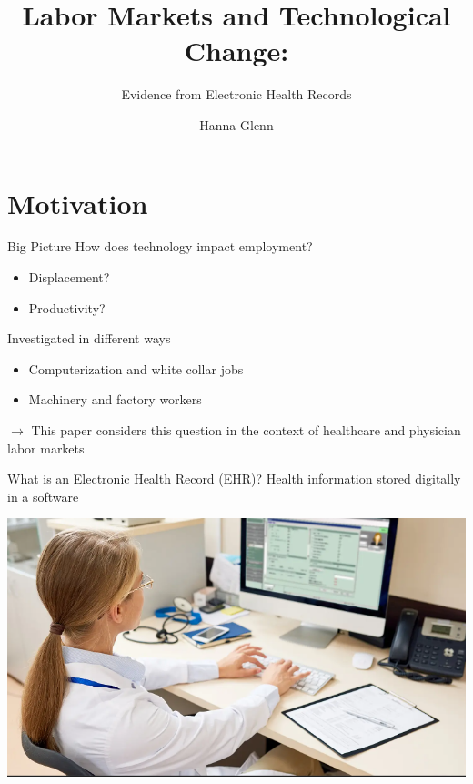 \documentclass[10pt]{beamer}
\title{Labor Markets and Technological Change: }
\subtitle{Evidence from Electronic Health Records}
\date{}
\author{Hanna Glenn}
\institute{Emory University}
\begin{document}


\maketitle

\section[Motivation]{Motivation}

\begin{frame}[fragile]{Big Picture}
How does technology impact employment?
                \vspace{2mm}
    \begin{itemize}
        \item Displacement?
                \vspace{2mm}
        \item Productivity?
    \end{itemize}
                \vspace{4mm}
Investigated in different ways
                \vspace{2mm}
    \begin{itemize}
        \item Computerization and white collar jobs
                \vspace{2mm}
        \item Machinery and factory workers
    \end{itemize}
                \vspace{4mm}
                \pause
\begin{alertblock}{$\rightarrow$ This paper considers this question in the context of healthcare and physician labor markets}\end{alertblock}
\end{frame}


\begin{frame}[fragile]{What is an Electronic Health Record (EHR)?}
Health information stored digitally in a software
                \vspace{4mm}
\begin{center}
\includegraphics[scale=.4]{Objects/EHR_picture.PNG}
\end{center}
\end{frame}
\end{document}

